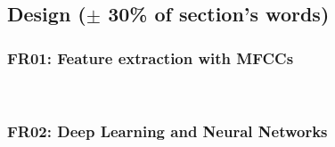 \subsection{Design ($\pm$ 30\% of section's words)}

\subsubsection{FR01: Feature extraction with MFCCs}\label{mfccs}~\\


\subsubsection{FR02: Deep Learning and Neural Networks}



